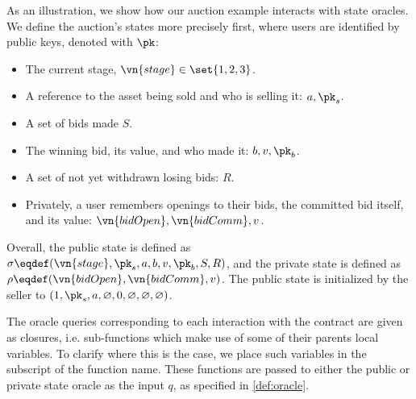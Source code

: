 As an illustration, we show how our auction example interacts with state
oracles. We define the auction's states more precisely first, where users are
identified by public keys, denoted with $\pk$:

\newcommand{\openbid}{\vn{bidOpen}}
\newcommand{\bidcomm}{\vn{bidComm}}

\begin{itemize}
  \item The current stage, $\vn{stage} \in \set{1, 2, 3}$.
  \item A reference to the asset being sold and who is selling it: $a, \pk_s$.
  \item A set of bids made $S$.
  \item The winning bid, its value, and who made it: $b,
    v, \pk_b$.
  \item A set of not yet withdrawn losing bids: $R$.
  \item Privately, a user remembers openings to their bids, the committed bid
    itself, and its value: $\openbid, \bidcomm, v$.
\end{itemize}

Overall, the public state is defined as $\sigma \eqdef (\vn{stage}, \pk_s, a, b,
\allowbreak v,\allowbreak \pk_b, S, R)$, and the
private state is defined as $\rho \eqdef (\openbid,\allowbreak \bidcomm, v)$. The public state is
initialized by the seller to $(1,\pk_s, a, \varnothing, 0, \varnothing,\allowbreak
\varnothing, \varnothing)$.

The oracle queries corresponding to each interaction with the contract are
given as closures, i.e. sub-functions which make use of some of their
parents local variables. To clarify where this is the case, we place such
variables in the subscript of the function name. These functions are passed to
either the public or private state oracle as the input $q$, as specified in
\autoref{def:oracle}.


